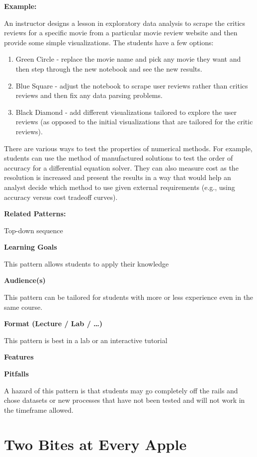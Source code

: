 \documentclass[]{book}
\providecommand{\tightlist}{%
  \setlength{\itemsep}{0pt}\setlength{\parskip}{0pt}}
\begin{document}
\textbf{Example:}

An instructor designs a lesson in exploratory data analysis to scrape
the critics reviews for a specific movie from a particular movie review
website and then provide some simple visualizations. The students have a
few options:

\begin{enumerate}
\def\labelenumi{\arabic{enumi}.}
\tightlist
\item
  Green Circle - replace the movie name and pick any movie they want and
  then step through the new notebook and see the new results.
\item
  Blue Square - adjust the notebook to scrape user reviews rather than
  critics reviews and then fix any data parsing problems.
\item
  Black Diamond - add different visualizations tailored to explore the
  user reviews (as opposed to the initial visualizations that are
  tailored for the critic reviews).
\end{enumerate}

There are various ways to test the properties of numerical methods. For
example, students can use the method of manufactured solutions to test
the order of accuracy for a differential equation solver. They can also
measure cost as the resolution is increased and present the results in a
way that would help an analyst decide which method to use given external
requirements (e.g., using accuracy versus cost tradeoff curves).

\textbf{Related Patterns:}

Top-down sequence

\textbf{Learning Goals}

This pattern allows students to apply their knowledge

\textbf{Audience(s)}

This pattern can be tailored for students with more or less experience
even in the same course.

\textbf{Format (Lecture / Lab / \ldots{})}

This pattern is best in a lab or an interactive tutorial

\textbf{Features}

\textbf{Pitfalls}

A hazard of this pattern is that students may go completely off the
rails and chose datasets or new processes that have not been tested and
will not work in the timeframe allowed.

\section{Two Bites at Every Apple}\label{two-bites-at-every-apple}
\end{document}
